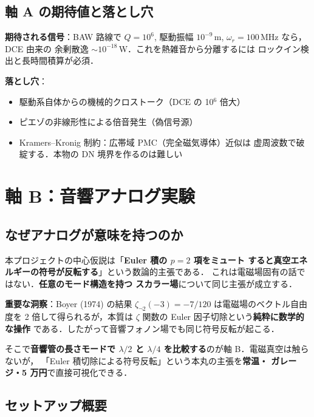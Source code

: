 \documentclass[11pt,a4paper]{article}
\begin{document}
\subsection{軸 A の期待値と落とし穴}

\textbf{期待される信号}：BAW 路線で $Q=10^6$, 駆動振幅
$10^{-9}$\,m, $\omega_r=100$\,MHz なら，DCE 由来の
余剰散逸 $\sim 10^{-18}$\,W．これを熱雑音から分離するには
ロックイン検出と長時間積算が必須．

\textbf{落とし穴}：
\begin{itemize}
\item 駆動系自体からの機械的クロストーク（DCE の 10$^{6}$ 倍大）
\item ピエゾの非線形性による倍音発生（偽信号源）
\item Kramers--Kronig 制約：広帯域 PMC（完全磁気導体）近似は
虚周波数で破綻する．本物の DN 境界を作るのは難しい
\end{itemize}

\newpage
\section{軸 B：音響アナログ実験}

\subsection{なぜアナログが意味を持つのか}

本プロジェクトの中心仮説は「\textbf{Euler 積の $p=2$ 項をミュート
すると真空エネルギーの符号が反転する}」という数論的主張である．
これは電磁場固有の話ではない．\textbf{任意のモード構造を持つ
スカラー場}について同じ主張が成立する．

\begin{tcolorbox}[colback=blue!5,colframe=blue!50!black]
\textbf{重要な洞察}：Boyer (1974) の結果 $\zeta_{\neg 2}(-3) = -7/120$
は電磁場のベクトル自由度を 2 倍して得られるが，本質は
$\zeta$ 関数の Euler 因子切除という\textbf{純粋に数学的な操作}
である．したがって音響フォノン場でも同じ符号反転が起こる．
\end{tcolorbox}

そこで\textbf{音響管の長さモードで $\lambda/2$ と $\lambda/4$
を比較する}のが軸 B．電磁真空は触らないが，
「Euler 積切除による符号反転」という本丸の主張を\textbf{常温・
ガレージ・5 万円}で直接可視化できる．

\subsection{セットアップ概要}
\end{document}
